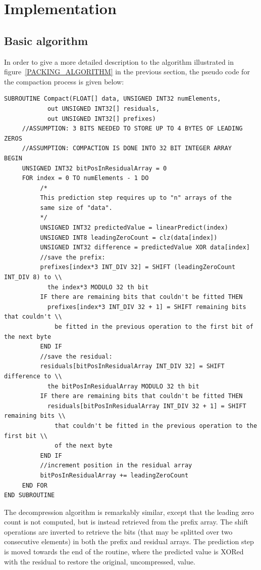\section{Implementation}
 \subsection{Basic algorithm}
  In order to give a more detailed description to the algorithm illustrated in figure~\ref{PACKING_ALGORITHM} in the previous section, the pseudo code for the compaction
  process is given below:
\begin{verbatim}
SUBROUTINE Compact(FLOAT[] data, UNSIGNED INT32 numElements, 
		    out UNSIGNED INT32[] residuals, 
		    out UNSIGNED INT32[] prefixes)
	 //ASSUMPTION: 3 BITS NEEDED TO STORE UP TO 4 BYTES OF LEADING ZEROS
	 //ASSUMPTION: COMPACTION IS DONE INTO 32 BIT INTEGER ARRAY
BEGIN
	 UNSIGNED INT32 bitPosInResidualArray = 0
	 FOR index = 0 TO numElements - 1 DO
		  /*
		  This prediction step requires up to "n" arrays of the 
		  same size of "data".
		  */
		  UNSIGNED INT32 predictedValue = linearPredict(index) 
		  UNSIGNED INT8 leadingZeroCount = clz(data[index])
		  UNSIGNED INT32 difference = predictedValue XOR data[index]
		  //save the prefix:
		  prefixes[index*3 INT_DIV 32] = SHIFT (leadingZeroCount INT_DIV 8) to \\
		    the index*3 MODULO 32 th bit
		  IF there are remaining bits that couldn't be fitted THEN
		    prefixes[index*3 INT_DIV 32 + 1] = SHIFT remaining bits that couldn't \\
		      be fitted in the previous operation to the first bit of the next byte
		  END IF
		  //save the residual:
		  residuals[bitPosInResidualArray INT_DIV 32] = SHIFT difference to \\
		    the bitPosInResidualArray MODULO 32 th bit
		  IF there are remaining bits that couldn't be fitted THEN
		    residuals[bitPosInResidualArray INT_DIV 32 + 1] = SHIFT remaining bits \\
		      that couldn't be fitted in the previous operation to the first bit \\
		      of the next byte
		  END IF  
		  //increment position in the residual array
		  bitPosInResidualArray += leadingZeroCount
	 END FOR
END SUBROUTINE 
\end{verbatim}
The decompression algorithm is remarkably similar, except that the leading zero count is not computed, but is instead retrieved from the prefix array. The shift
operations are inverted to retrieve the bits (that may be splitted over two consecutive elements) in both the prefix and residual arrays. The prediction step is moved towards
the end of the routine, where the predicted value is XORed with the residual to restore the original, uncompressed, value.
